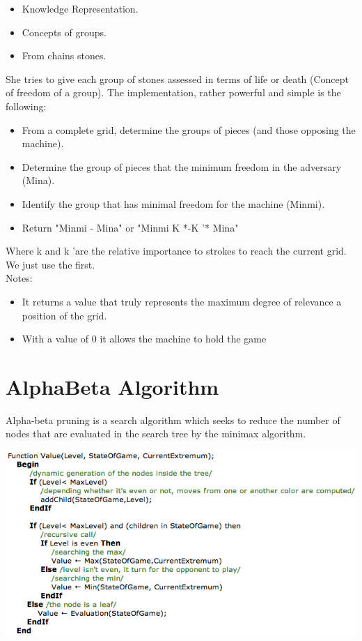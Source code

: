 \documentclass{report}
\begin{document}
\begin{itemize}
   \item Knowledge Representation.
    \item Concepts of groups.
    \item From chains stones.
\end{itemize}

She tries to give each group of stones assessed in terms of life or death
(Concept of freedom of a group).
The implementation, rather powerful and simple is the following:\\

\begin{itemize}
    \item From a complete grid, determine the groups of pieces (and those opposing
        the machine).
    \item Determine the group of pieces that the minimum freedom in the adversary (Mina).
   \item Identify the group that has minimal freedom for the machine (Minmi).
    \item Return  { "Minmi - Mina"} or { "Minmi K *-K '* Mina"}
\end{itemize}

Where k and k 'are the relative importance to strokes to reach the current
grid. We just use the first.\\
Notes:
\begin{itemize}
    \item It returns a value that truly represents the maximum degree of relevance
        a position of the grid.
    \item With a value of 0 it allows the machine to hold the game 
\end{itemize}


\section{AlphaBeta Algorithm  }

Alpha-beta pruning is a search algorithm which seeks to reduce the number of nodes that are evaluated in the search tree by the minimax algorithm.

\begin{center}
\includegraphics[scale=0.60]{images/AlphaBeta.png}
\end{center}
\end{document}

